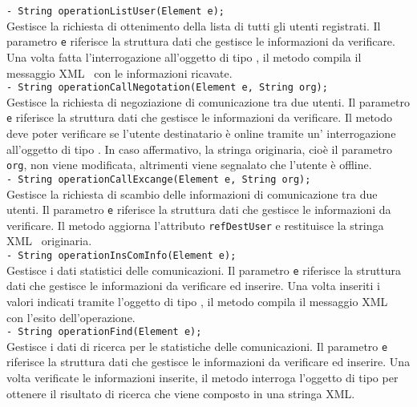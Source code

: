 {{\begin{sloppypar}
{{{\begin{itemize}
{					\texttt{- String operationListUser(Element e);}\\
					Gestisce la richiesta di ottenimento della lista di tutti gli utenti registrati. Il parametro \texttt{e} riferisce la struttura dati che gestisce le informazioni da verificare.
					Una volta fatta l'interrogazione all'oggetto di tipo , il metodo compila il messaggio XML\g~ con le informazioni ricavate.\\
					
					\texttt{- String operationCallNegotation(Element e, String org);}\\
					Gestisce la richiesta di negoziazione di comunicazione tra due utenti. Il parametro \texttt{e} riferisce la struttura dati che gestisce le informazioni da verificare.
					Il metodo deve poter verificare se l'utente destinatario è online tramite un' interrogazione all'oggetto di tipo . In caso affermativo, la stringa originaria, cioè il parametro \texttt{org}, non viene modificata, altrimenti viene segnalato che l'utente è offline.\\
					
					\texttt{- String operationCallExcange(Element e, String org);}\\
					Gestisce la richiesta di scambio delle informazioni di comunicazione tra due utenti. Il parametro \texttt{e} riferisce la struttura dati che gestisce le informazioni da verificare.
					Il metodo aggiorna l'attributo \texttt{refDestUser} e restituisce la stringa XML\g~ originaria.\\
					
					\texttt{- String operationInsComInfo(Element e);}\\
					Gestisce i dati statistici delle comunicazioni. Il parametro \texttt{e} riferisce la struttura dati che gestisce le informazioni da verificare ed inserire.
					Una volta inseriti i valori indicati tramite l'oggetto di tipo , il metodo compila il messaggio XML\g~ con l'esito dell'operazione.\\
					
					\texttt{- String operationFind(Element e);}\\
					Gestisce i dati di ricerca per le statistiche delle comunicazioni. Il parametro \texttt{e} riferisce la struttura dati che gestisce le informazioni da verificare ed inserire.
					Una volta verificate le informazioni inserite, il metodo interroga l'oggetto di tipo   per ottenere il risultato di ricerca che viene composto in una stringa XML\g.\\
					
}
\end{itemize}}}}
\end{sloppypar}}}
